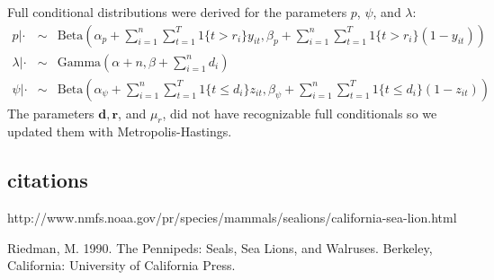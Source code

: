 \documentclass[12pt, a4paper]{article}
\begin{document}
Full conditional distributions were derived for the parameters $p$, $\psi$, and $\lambda$:
\begin{eqnarray*}
p | \cdot & \sim & \text{Beta} \left( \alpha_p + \sum_{i=1}^n \sum_{t=1}^T 1 \{ t > r_i \} y_{it}, \beta_p + \sum_{i=1}^n \sum_{t=1}^T 1\{ t > r_i \} (1 - y_{it}) \right)  \\
\lambda | \cdot & \sim & \text{Gamma} \left( \alpha + n, \beta + \sum_{i=1}^n d_i \right) \\
\psi | \cdot & \sim & \text{Beta}\left( \alpha_{\psi} + \sum_{i=1}^n \sum_{t=1}^T 1\{t \leq d_i \} z_{it}, \beta_{\psi} + \sum_{i=1}^n \sum_{t=1}^T 1\{t \leq d_i \} (1 - z_{it}) \right) 
\end{eqnarray*}
The parameters $\mathbf{d}, \mathbf{r}$, and $\mu_r$, did not have recognizable full conditionals so we updated them with Metropolis-Hastings.  

\subsection{citations} 

http://www.nmfs.noaa.gov/pr/species/mammals/sealions/california-sea-lion.html


Riedman, M. 1990. The Pennipeds: Seals, Sea Lions, and Walruses. Berkeley, California: University of California Press. 
\end{document}
